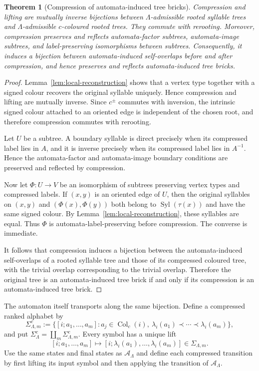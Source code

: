 \documentclass[11pt,a4paper]{amsart}
\newcommand{\Syl}{\operatorname{Syl}}
\theoremstyle{definition}
\theoremstyle{plain}
\newtheorem{theorem}[definition]{Theorem}
\theoremstyle{remark}
\numberwithin{equation}{section}
\begin{document}
\begin{theorem}[Compression of automata-induced tree bricks]
\label{thm:compression}
Compression and lifting are mutually inverse bijections between $\Lambda$-admissible rooted syllable trees and $\Lambda$-admissible $c$-coloured rooted trees. They commute with rerooting. Moreover, compression preserves and reflects automata-factor subtrees, automata-image subtrees, and label-preserving isomorphisms between subtrees. Consequently, it induces a bijection between automata-induced self-overlaps before and after compression, and hence preserves and reflects automata-induced tree bricks.
\end{theorem}

\begin{proof}
Lemma~\ref{lem:local-reconstruction} shows that a vertex type together with a signed colour recovers the original syllable uniquely. Hence compression and lifting are mutually inverse. Since $c^{\pm}$ commutes with inversion, the intrinsic signed colour attached to an oriented edge is independent of the chosen root, and therefore compression commutes with rerooting.

Let $U$ be a subtree. A boundary syllable is direct precisely when its compressed label lies in $A$, and it is inverse precisely when its compressed label lies in $A^{-1}$. Hence the automata-factor and automata-image boundary conditions are preserved and reflected by compression.

Now let $\Phi:U\to V$ be an isomorphism of subtrees preserving vertex types and compressed labels. If $(x,y)$ is an oriented edge of $U$, then the original syllables on $(x,y)$ and $(\Phi(x),\Phi(y))$ both belong to $\Syl(\tau(x))$
and have the same signed colour. By Lemma~\ref{lem:local-reconstruction}, these syllables are equal. Thus $\Phi$ is automata-label-preserving before compression. The converse is immediate.

It follows that compression induces a bijection between the automata-induced self-overlaps of a rooted syllable tree and those of its compressed coloured tree, with the trivial overlap corresponding to the trivial overlap. Therefore the original tree is an automata-induced tree brick if and only if its compression is an automata-induced tree brick.
\end{proof}

The automaton itself transports along the same bijection. Define a compressed ranked alphabet by
\[
\Sigma^c_{\Lambda,m}:=\{[i;a_1,\ldots,a_m]:a_j\in\operatorname{Col}_c(i),\ \lambda_i(a_1)\prec\cdots\prec\lambda_i(a_m)\},
\]
and put $\Sigma^c_\Lambda=\coprod_m\Sigma^c_{\Lambda,m}$. Every symbol has a unique lift
\[
[i;a_1,\ldots,a_m]\longmapsto[i;\lambda_i(a_1),\ldots,\lambda_i(a_m)]\in\Sigma_{\Lambda,m}.
\]
Use the same states and final states as $\mathcal A_\Lambda$ and define each compressed transition by first lifting its input symbol and then applying the transition of $\mathcal A_\Lambda$.
\end{document}
